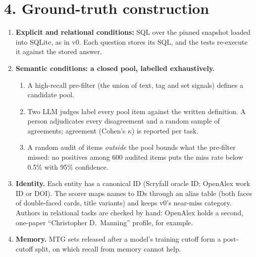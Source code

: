 \documentclass[10pt]{article}
\begin{document}
\section*{4. Ground-truth construction}
\begin{enumerate}
\item \textbf{Explicit and relational conditions:} SQL over the pinned snapshot loaded into SQLite, as in v0. Each
question stores its SQL, and the tests re-execute it against the stored answer.
\item \textbf{Semantic conditions: a closed pool, labelled exhaustively.}
  \begin{enumerate}
  \item A high-recall pre-filter (the union of text, tag and set signals) defines a candidate pool.
  \item Two LLM judges label every pool item against the written definition. A person adjudicates every
  disagreement and a random sample of agreements; agreement (Cohen's $\kappa$) is reported per task.
  \item A random audit of items \emph{outside} the pool bounds what the pre-filter missed: no positives among 600
  audited items puts the miss rate below 0.5\% with 95\% confidence.
  \end{enumerate}
\item \textbf{Identity.} Each entity has a canonical ID (Scryfall oracle ID; OpenAlex work ID or DOI). The scorer
maps names to IDs through an alias table (both faces of double-faced cards, title variants) and keeps v0's
near-miss category. Authors in relational tasks are checked by hand: OpenAlex holds a second, one-paper
``Christopher D.\ Manning'' profile, for example.
\item \textbf{Memory.} MTG sets released after a model's training cutoff form a post-cutoff split, on which
recall from memory cannot help.
\end{enumerate}
\end{document}
